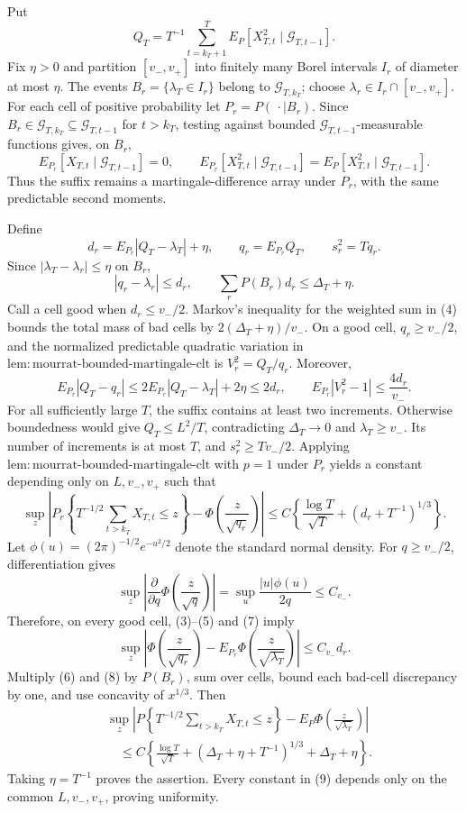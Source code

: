 Put
\[
 Q_T=T^{-1}\sum_{t=k_T+1}^T
 E_P[X_{T,t}^2\mid\mathcal G_{T,t-1}].
\tag{1}
\]
Fix \(\eta>0\) and partition \([v_-,v_+]\) into finitely many Borel intervals \(I_r\) of diameter at most \(\eta\). The events \(B_r=\{\lambda_T\in I_r\}\) belong to \(\mathcal G_{T,k_T}\); choose \(\lambda_r\in I_r\cap[v_-,v_+]\). For each cell of positive probability let \(P_r=P(\,\cdot\mid B_r)\). Since \(B_r\in\mathcal G_{T,k_T}\subseteq\mathcal G_{T,t-1}\) for \(t>k_T\), testing against bounded \(\mathcal G_{T,t-1}\)-measurable functions gives, on \(B_r\),
\[
 E_{P_r}[X_{T,t}\mid\mathcal G_{T,t-1}]=0,
 \qquad
 E_{P_r}[X_{T,t}^2\mid\mathcal G_{T,t-1}]
 =E_P[X_{T,t}^2\mid\mathcal G_{T,t-1}].
\tag{2}
\]
Thus the suffix remains a martingale-difference array under \(P_r\), with the same predictable second moments.

Define
\[
 d_r=E_{P_r}|Q_T-\lambda_T|+\eta,\qquad
 q_r=E_{P_r}Q_T,\qquad s_r^2=Tq_r.
\tag{3}
\]
Since \(|\lambda_T-\lambda_r|\le\eta\) on \(B_r\),
\[
 |q_r-\lambda_r|\le d_r,\qquad
 \sum_rP(B_r)d_r\le\Delta_T+\eta.
\tag{4}
\]
Call a cell good when \(d_r\le v_-/2\). Markov's inequality for the weighted sum in (4) bounds the total mass of bad cells by \(2(\Delta_T+\eta)/v_-\). On a good cell, \(q_r\ge v_-/2\), and the normalized predictable quadratic variation in \(\mathrm{lem:mourrat\text{-}bounded\text{-}martingale\text{-}clt}\) is \(V_r^2=Q_T/q_r\). Moreover,
\[
 E_{P_r}|Q_T-q_r|
 \le2E_{P_r}|Q_T-\lambda_T|+2\eta\le2d_r,
 \qquad E_{P_r}|V_r^2-1|\le\frac{4d_r}{v_-}.
\tag{5}
\]
For all sufficiently large \(T\), the suffix contains at least two increments. Otherwise boundedness would give \(Q_T\le L^2/T\), contradicting \(\Delta_T\to0\) and \(\lambda_T\ge v_-\). Its number of increments is at most \(T\), and \(s_r^2\ge Tv_-/2\). Applying \(\mathrm{lem:mourrat\text{-}bounded\text{-}martingale\text{-}clt}\) with \(p=1\) under \(P_r\) yields a constant depending only on \(L,v_-,v_+\) such that
\[
 \sup_z\left|P_r\!\left\{T^{-1/2}\sum_{t>k_T}X_{T,t}\le z\right\}
 -\Phi\!\left(\frac z{\sqrt{q_r}}\right)\right|
 \le C\left\{\frac{\log T}{\sqrt T}+(d_r+T^{-1})^{1/3}\right\}.
\tag{6}
\]
Let \(\phi(u)=(2\pi)^{-1/2}e^{-u^2/2}\) denote the standard normal density. For \(q\ge v_-/2\), differentiation gives
\[
 \sup_z\left|\frac{\partial}{\partial q}
 \Phi\!\left(\frac z{\sqrt q}\right)\right|
 =\sup_u\frac{|u|\phi(u)}{2q}\le C_{v_-}.
\tag{7}
\]
Therefore, on every good cell, (3)--(5) and (7) imply
\[
 \sup_z\left|\Phi\!\left(\frac z{\sqrt{q_r}}\right)
 -E_{P_r}\Phi\!\left(\frac z{\sqrt{\lambda_T}}\right)\right|
 \le C_{v_-}d_r.
\tag{8}
\]
Multiply (6) and (8) by \(P(B_r)\), sum over cells, bound each bad-cell discrepancy by one, and use concavity of \(x^{1/3}\). Then
\[
\begin{aligned}
 &\sup_z\left|P\!\left\{T^{-1/2}\sum_{t>k_T}X_{T,t}\le z\right\}
 -E_P\Phi\!\left(\frac z{\sqrt{\lambda_T}}\right)\right|\\
 &\quad\le C\left\{\frac{\log T}{\sqrt T}
 +(\Delta_T+\eta+T^{-1})^{1/3}+\Delta_T+\eta\right\}.
\end{aligned}
\tag{9}
\]
Taking \(\eta=T^{-1}\) proves the assertion. Every constant in (9) depends only on the common \(L,v_-,v_+\), proving uniformity.